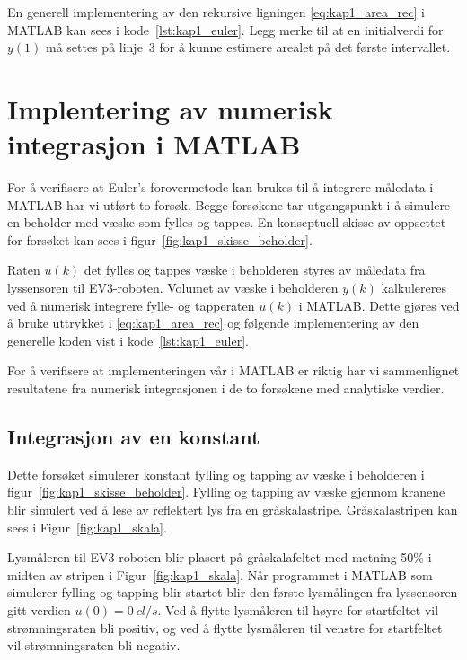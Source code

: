\documentclass[main.tex]{subfiles}
\begin{document}
En generell implementering av den rekursive ligningen \eqref{eq:kap1_area_rec} i \textsc{MATLAB} kan sees i kode~\ref{lst:kap1_euler}. Legg merke til at en initialverdi for $y(1)$ må settes på linje~3 for å kunne estimere arealet på det første intervallet.



\section{Implentering av numerisk integrasjon i \textsc{MATLAB}}

For å verifisere at Euler's forovermetode kan brukes til å integrere måledata i \textsc{MATLAB} har vi utført to forsøk. Begge forsøkene tar utgangspunkt i å simulere en beholder med væske som fylles og tappes. En konseptuell skisse av oppsettet for forsøket kan sees i figur~\ref{fig:kap1_skisse_beholder}.



Raten $u(k)$ det fylles og tappes væske i beholderen styres av måledata fra lyssensoren til \textsc{EV3}-roboten. Volumet av væske i beholderen $y(k)$ kalkulereres ved å numerisk integrere fylle- og tapperaten $u(k)$ i \textsc{MATLAB}. Dette gjøres ved å bruke uttrykket i \eqref{eq:kap1_area_rec} og følgende implementering av den generelle koden vist i kode~\ref{lst:kap1_euler}.



For å verifisere at implementeringen vår i \textsc{MATLAB} er riktig har vi sammenlignet resultatene fra numerisk integrasjonen i de to forsøkene med analytiske verdier.

\subsection{Integrasjon av en konstant}\label{sub:kap1_integrasjon_konstant}

Dette forsøket simulerer konstant fylling og tapping av væske i beholderen i figur~\ref{fig:kap1_skisse_beholder}. Fylling og tapping av væske gjennom kranene blir simulert ved å lese av reflektert lys fra en gråskalastripe. Gråskalastripen kan sees i Figur~\ref{fig:kap1_skala}.



Lysmåleren til \textsc{EV3}-roboten blir plasert på gråskalafeltet med metning 50\% i midten av stripen i Figur~\ref{fig:kap1_skala}. Når programmet i \textsc{MATLAB} som simulerer fylling og tapping blir startet blir den første lysmålingen fra lyssensoren gitt verdien $u(0) = \SI{0}{cl/s}$. Ved å flytte lysmåleren til høyre for startfeltet vil strømningsraten bli positiv, og ved å flytte lysmåleren til venstre for startfeltet vil strømningsraten bli negativ.
\end{document}
